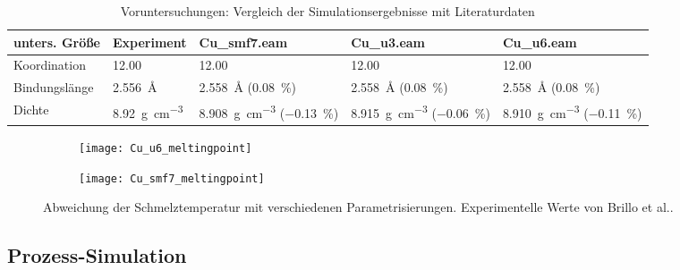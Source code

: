 \begin{table}
  \caption[Eigenschaften von Kupfer]{Voruntersuchungen: Vergleich der Simulationsergebnisse mit Literaturdaten}
  \label{tab:copperpreresults}
  \begin{tabularx}{\textwidth}{|lXXXX|}
    \hline
    \textbf{unters. Größe} & \textbf{Experiment} & \textbf{Cu\_smf7.eam} & \textbf{Cu\_u3.eam} & \textbf{Cu\_u6.eam} \\
    \hline
    Koordination   &  \SI{12.00}{} & \SI{12.00}{} & \SI{12.00}{} & \SI{12.00}{} \\
    Bindungslänge  &  \SI{2.556}{\angstrom} & \SI{2.558}{\angstrom} (\SI{0.08}{\percent}) & \SI{2.558}{\angstrom} (\SI{0.08}{\percent}) & \SI{2.558}{\angstrom} (\SI{0.08}{\percent}) \\
    Dichte         & \SI{8.92}{\gram\per\cubic\centi\meter} & \SI{8.908}{\gram\per\cubic\centi\meter} (\SI{-0.13}{\percent}) & \SI{8.915}{\gram\per\cubic\centi\meter} (\SI{-0.06}{\percent}) & \SI{8.910}{\gram\per\cubic\centi\meter}  (\SI{-0.11}{\percent}) \\
    \hline
  \end{tabularx}
\end{table}

\begin{figure}
  \captionsetup[subfigure]{singlelinecheck=false}
  \def\subfigwidth{7cm}
  \begin{subfigure}[t]{\subfigwidth}
    \texttt{[image: Cu\_u6\_meltingpoint]}
  \end{subfigure}
  \hfill
  \begin{subfigure}[t]{\subfigwidth}
    \texttt{[image: Cu\_smf7\_meltingpoint]}
  \end{subfigure}
  \caption[Abweichung der Schmelztemperaturen bei Kupfer-MD]{
    Abweichung der Schmelztemperatur mit verschiedenen Parametrisierungen.
    Experimentelle Werte von Brillo et al.\cite{brillo_density_2006}.
  }
  \label{fig:copperthermo}
\end{figure}

\subsection{Prozess-Simulation}
\label{coppersimulation}

